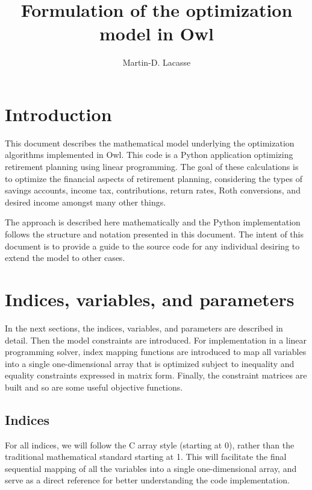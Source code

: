 \documentclass{report}[fleqn,12pt]
\begin{document}
\title{Formulation of the optimization model in Owl}
\author{Martin-D. Lacasse}
\maketitle
\thispagestyle{fancy}
\fancyhead{}

\chapter{Introduction}
This document describes the mathematical model underlying
the optimization algorithms implemented in
Owl. This code is a Python application optimizing retirement
planning using linear programming. The goal of
these calculations is to optimize the financial aspects
of retirement planning, considering the types of savings accounts,
income tax, contributions, return rates, Roth conversions,
and desired income amongst many other things.

The approach is described here mathematically and the Python implementation
follows the structure and notation presented in this document.
The intent of this document is to provide a guide to the source code
for any individual desiring to extend the model to other cases.

\chapter{Indices, variables, and parameters}
In the next sections, the indices, variables, and parameters are
described in detail. Then the model constraints are introduced.
For implementation in a linear programming solver, index mapping
functions are introduced to map all variables into a single
one-dimensional array that
is optimized subject to inequality and equality constraints
expressed in matrix form. Finally, the constraint matrices are built
and so are some useful objective functions.

\section{Indices}
For all indices, we will follow the C array style (starting at 0),
rather than the traditional mathematical standard starting at 1.
This will facilitate the final
sequential mapping of all the variables into a single one-dimensional array,
and serve as a direct reference for better understanding the code implementation.
\end{document}
